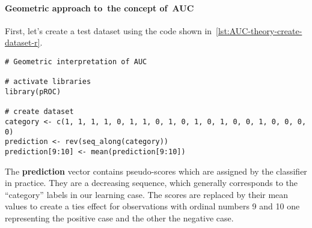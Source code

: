\documentclass[]{scrreprt}
\begin{document}
\paragraph{Geometric approach to~the concept of~AUC}
First, let's create a test dataset using the code shown in~\ref{lst:AUC-theory-create-dataset-r}.
%
\begin{lstlisting}[float=htp, caption = Create a~test data set, firstnumber=1, label= lst:AUC-theory-create-dataset-r]
# Geometric interpretation of AUC

# activate libraries
library(pROC)

# create dataset
category <- c(1, 1, 1, 1, 0, 1, 1, 0, 1, 0, 1, 0, 1, 0, 0, 1, 0, 0, 0, 0)
prediction <- rev(seq_along(category))
prediction[9:10] <- mean(prediction[9:10])
\end{lstlisting}
%
The \textbf{prediction} vector contains pseudo-scores which are assigned by the classifier in practice. They are a decreasing sequence, which generally corresponds to the ``category'' labels in our learning case. The scores are replaced by their mean values to create a ties effect for observations with ordinal numbers 9 and 10 one representing the positive case and the other the negative case.
\end{document}
